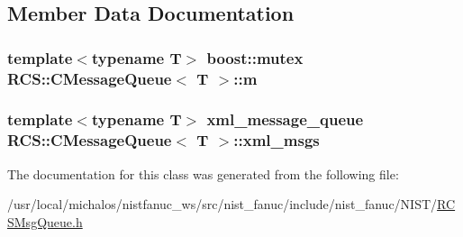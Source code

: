 \subsection{Member Data Documentation}
\hypertarget{classRCS_1_1CMessageQueue_a874fdf08657e4ca2da89168bb6176c49}{
\subsubsection[{m}]{\setlength{\rightskip}{0pt plus 5cm}template$<$typename T$>$ boost\-::mutex {\bf R\-C\-S\-::\-C\-Message\-Queue}$<$ T $>$\-::m\hspace{0.3cm}{\ttfamily [protected]}}}\label{classRCS_1_1CMessageQueue_a874fdf08657e4ca2da89168bb6176c49}
\hypertarget{classRCS_1_1CMessageQueue_aa699f0b2f9f057242c5f0d3882f14ecb}{
\subsubsection[{xml\-\_\-msgs}]{\setlength{\rightskip}{0pt plus 5cm}template$<$typename T$>$ {\bf xml\-\_\-message\-\_\-queue} {\bf R\-C\-S\-::\-C\-Message\-Queue}$<$ T $>$\-::xml\-\_\-msgs\hspace{0.3cm}{\ttfamily [protected]}}}\label{classRCS_1_1CMessageQueue_aa699f0b2f9f057242c5f0d3882f14ecb}


The documentation for this class was generated from the following file\-:\begin{DoxyCompactItemize}
\item 
/usr/local/michalos/nistfanuc\-\_\-ws/src/nist\-\_\-fanuc/include/nist\-\_\-fanuc/\-N\-I\-S\-T/\hyperlink{RCSMsgQueue_8h}{R\-C\-S\-Msg\-Queue.\-h}\end{DoxyCompactItemize}
